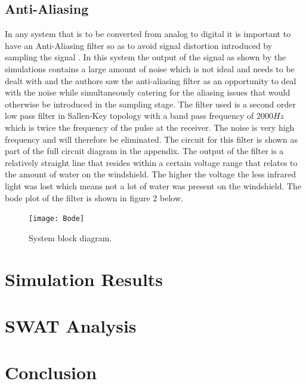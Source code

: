 \documentclass[conference, 11pt]{IEEEtran}
\begin{document}
\subsection{Anti-Aliasing}
In any system that is to be converted from analog to digital it is important to have an Anti-Aliasing filter so as to avoid signal distortion introduced by sampling the signal \cite{FILT}. In this system the output of the signal as shown by the simulations contains a large amount of noise which is not ideal and needs to be dealt with and the authors saw the anti-aliasing filter as an opportunity to deal with the noise while simultaneously catering for the aliasing issues that would otherwise be introduced in the sampling stage. The filter used is a second order low pass filter in Sallen-Key topology with a band pass frequency of $2000Hz$ which is twice the frequency of the pulse at the receiver. The noise is very high frequency and will therefore be eliminated. The circuit for this filter is shown as part of the full circuit diagram in the appendix. The output of the filter is a relatively straight line that resides within a certain voltage range that relates to the amount of water on the windshield. The higher the voltage the less infrared light was lost which means not a lot of water was present on the windshield. The bode plot of the filter is shown in figure 2 below. 

 \begin{figure}[H]
 \centering 
 \texttt{[image: Bode]}
 \centering 
  \caption {System block diagram. }
 \end{figure}


\section{Simulation Results}



\section{SWAT Analysis}



\section{Conclusion}
\end{document}
